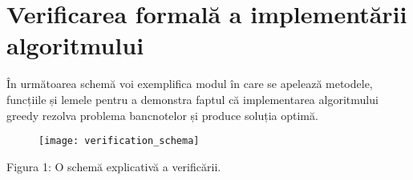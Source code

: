 

\chapter{Verificarea formală a implementării algoritmului}

În următoarea schemă voi exemplifica modul în care se apelează metodele, funcțiile și lemele pentru a demonstra faptul 
că implementarea algoritmului greedy rezolva problema bancnotelor și produce soluția optimă.\par
    \vspace{1cm}
\setcounter{figure}{0}
    \begin{figure}[h]
        \centering
          \texttt{[image: verification\_schema]}
      \end{figure} \par
Figura 1: O schemă explicativă a verificării.


